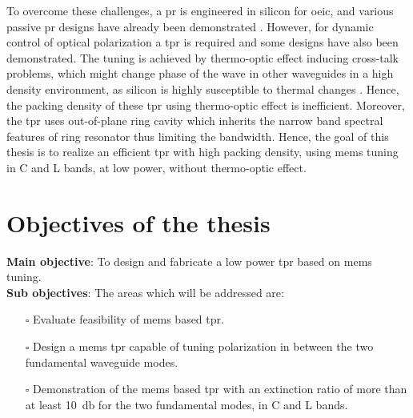 \documentclass[../report.tex]{subfiles}
\begin{document}
To overcome these challenges, a \gls{pr} is engineered in silicon for \gls{oeic}, and various passive \gls{pr} designs have already been demonstrated \cite{xie_efficient_2015,velasco_ultracompact_2012,leung_numerical_2011,wang_design_2014,dai_novel_2011,wirth_efficient_2012,chen_compact_2011}. However, for dynamic control of optical polarization a \gls{tpr} is required and some designs \cite{sarmiento-merenguel_demonstration_2015, xu_electrically_2014} have also been demonstrated. The tuning is achieved by thermo-optic effect inducing cross-talk problems, which might change phase of the wave in other waveguides in a high density environment, as silicon is highly susceptible to thermal changes \cite{ibrahim_athermal_2012}. Hence, the packing density of these \gls{tpr} using thermo-optic effect is inefficient. Moreover, the \gls{tpr} \cite{ xu_electrically_2014} uses out-of-plane ring cavity which inherits the narrow band spectral features of ring resonator thus limiting the bandwidth. Hence, the goal of this thesis is to realize an efficient \gls{tpr} with high packing density, using \gls{mems} tuning in C and L bands, at low power, without thermo-optic effect.

	\section{Objectives of the thesis}
\textbf{Main objective}: To design and fabricate a low power \gls{tpr} based on \gls{mems} tuning. \\

\noindent \textbf{Sub objectives}: The areas which will be addressed are:
\begin{itemize}	
	\item[$\square$] Evaluate feasibility of \gls{mems} based \gls{tpr}. 
	\item[$\square$] Design a \gls{mems} \gls{tpr} capable of tuning polarization in between the two fundamental waveguide modes.
	\item[$\square$] Demonstration of the \gls{mems} based \gls{tpr} with an extinction ratio of more than at least \SI{10}{\decibel} for the two fundamental modes, in C and L bands.
\end{itemize}
	
\end{document}
